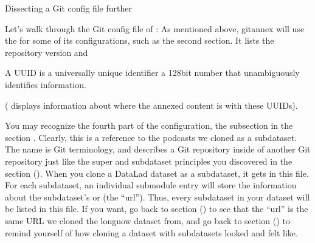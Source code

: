\ignorespaces \begin{findoutmore}[label={fom-gitconfig}, before title={\thetcbcounter\ }, float, floatplacement=tb, check odd page=true]{Dissecting a Git config file further}
\label{\detokenize{basics/101-122-config:fom-gitconfig}}

\sphinxAtStartPar
Let’s walk through the Git config file of :
As mentioned above, git\sphinxhyphen{}annex will use the
{\hyperref[\detokenize{glossary:term-Git-config-file}]{}} for some of its configurations, such as the second section.
It lists the repository version and {\hyperref[\detokenize{glossary:term-annex-UUID}]{}}%
\begin{footnote}\sphinxAtStartFootnote
A UUID is a universally unique identifier \textendash{} a 128\sphinxhyphen{}bit number
that unambiguously identifies information.
%
\end{footnote} ( displays information about where the
annexed content is with these UUIDs).

\sphinxAtStartPar
You may recognize the fourth part of the configuration, the subsection
 in the section .
Clearly, this is a reference to the  podcasts
we cloned as a subdataset. The name  is Git
terminology, and describes a Git repository inside of
another Git repository \textendash{} just like
the super\sphinxhyphen{} and subdataset principles you discovered in the
section {\hyperref[\detokenize{basics/101-106-nesting:nesting}]{}} (). When you clone a DataLad dataset
as a subdataset, it gets  in this file.
For each subdataset, an individual submodule entry
will store the information about the subdataset’s
 or  (the “url”).
Thus, every subdataset in your dataset
will be listed in this file.
If you want, go back to section {\hyperref[\detokenize{basics/101-105-install:installds}]{}} () to see that the
“url” is the same URL we cloned the longnow dataset from, and
go back to section {\hyperref[\detokenize{basics/101-116-sharelocal:sharelocal1}]{}} () to remind yourself of
how cloning a dataset with subdatasets looked and felt like.


\end{findoutmore}
